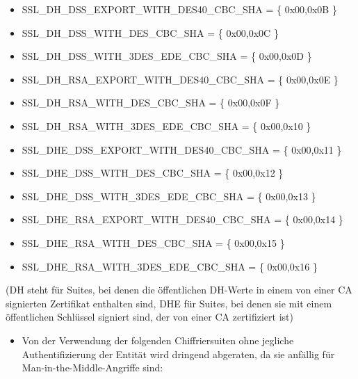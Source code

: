 \documentclass[a4paper]{article}
\begin{document}
\begin{multicols}{3}
\begin{itemize}
              \begin{itemize}
                  \item
                        SSL\_DH\_DSS\_EXPORT\_WITH\_DES40\_CBC\_SHA = \{ 0x00,0x0B \}
                  \item
                        SSL\_DH\_DSS\_WITH\_DES\_CBC\_SHA = \{ 0x00,0x0C \}
                  \item
                        SSL\_DH\_DSS\_WITH\_3DES\_EDE\_CBC\_SHA = \{ 0x00,0x0D \}
                  \item
                        SSL\_DH\_RSA\_EXPORT\_WITH\_DES40\_CBC\_SHA = \{ 0x00,0x0E \}
                  \item
                        SSL\_DH\_RSA\_WITH\_DES\_CBC\_SHA = \{ 0x00,0x0F \}
                  \item
                        SSL\_DH\_RSA\_WITH\_3DES\_EDE\_CBC\_SHA = \{ 0x00,0x10 \}
                  \item
                        SSL\_DHE\_DSS\_EXPORT\_WITH\_DES40\_CBC\_SHA = \{ 0x00,0x11 \}
                  \item
                        SSL\_DHE\_DSS\_WITH\_DES\_CBC\_SHA = \{ 0x00,0x12 \}
                  \item
                        SSL\_DHE\_DSS\_WITH\_3DES\_EDE\_CBC\_SHA = \{ 0x00,0x13 \}
                  \item
                        SSL\_DHE\_RSA\_EXPORT\_WITH\_DES40\_CBC\_SHA = \{ 0x00,0x14 \}
                  \item
                        SSL\_DHE\_RSA\_WITH\_DES\_CBC\_SHA = \{ 0x00,0x15 \}
                  \item
                        SSL\_DHE\_RSA\_WITH\_3DES\_EDE\_CBC\_SHA = \{ 0x00,0x16 \}
              \end{itemize}
    \end{itemize}

    (DH steht für Suites, bei denen die öffentlichen DH-Werte in einem von
    einer CA signierten Zertifikat enthalten sind, DHE für Suites, bei denen
    sie mit einem öffentlichen Schlüssel signiert sind, der von einer CA
    zertifiziert ist)

    \begin{itemize}
        \item
              Von der Verwendung der folgenden Chiffriersuiten ohne jegliche
              Authentifizierung der Entität wird dringend abgeraten, da sie anfällig
              für Man-in-the-Middle-Angriffe sind:


\end{itemize}
\end{multicols}
\end{document}

